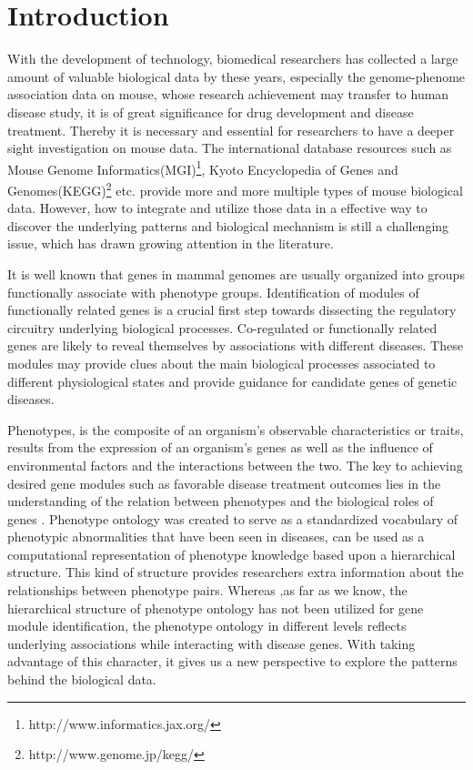 \documentclass{bmcart}
\begin{document}
\section*{Introduction}
With the development of technology, biomedical researchers has collected a large amount of valuable biological data by these years, especially the genome-phenome association data on mouse, whose research achievement may transfer to human disease study, it is of great significance for drug development and disease treatment. Thereby it is necessary and essential for researchers to have a deeper sight investigation on mouse data. The international database resources such as Mouse Genome Informatics(MGI)\footnote{http://www.informatics.jax.org/}, Kyoto Encyclopedia of Genes and Genomes(KEGG)\footnote{http://www.genome.jp/kegg/} etc. provide more and more multiple types of mouse biological data. However, how to integrate and utilize those data in a effective way to discover the underlying patterns and biological mechanism is still a challenging issue, which has drawn growing attention in the literature.

It is well known that genes in mammal genomes are usually organized into groups functionally associate with phenotype groups\cite{XuanH2015,Yao2011,Lage2007,Oti2006}. Identification of modules of functionally related genes is a crucial first step towards dissecting the regulatory circuitry underlying biological processes. Co-regulated or functionally related genes are likely to reveal themselves by associations with different diseases. These modules may provide clues about the main biological processes associated to different physiological states and provide guidance for candidate genes of genetic diseases.

Phenotypes, is the composite of an organism's observable characteristics or traits, results from the expression of an organism's genes as well as the influence of environmental factors and the interactions between the two\cite{McKusick2007,PhilipGroth2006}. The key to achieving desired gene modules such as favorable disease treatment outcomes lies in the understanding of the relation between phenotypes and the biological roles of genes \cite{Sawyers2008,Rubin2008,EdwardsD2004}. Phenotype ontology was created to serve as a standardized vocabulary of phenotypic abnormalities that have been seen in diseases, can be used as a computational representation of phenotype knowledge based upon a hierarchical structure\cite{Robinson2014,Kohler2014,Smith2009}. This kind of structure provides researchers extra information about the relationships between phenotype pairs. Whereas ,as far as we know, the hierarchical structure of phenotype ontology has not been utilized for gene module identification, the phenotype ontology in different levels reflects underlying associations while interacting with disease genes. With taking advantage of this character, it gives us a new perspective to explore the patterns behind the biological data.
\end{document}
